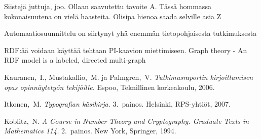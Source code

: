 \documentclass[finnish,12pt]{article}
\begin{document}
Siistejä juttuja, joo. Ollaan saavutettu tavoite A. Tässä hommassa kokonaisuutena on vielä haasteita. Olisipa hienoa saada selville asia Z

Automaatiosuunnittelu on siirtynyt yhä enemmän tietopohjaisesta tutkimuksesta

RDF:ää voidaan käyttää tehtaan PI-kaavion miettimiseen.
Graph theory - An RDF model is a labeled, directed multi-graph


\clearpage
{}

\begin{thebibliography}{99}
	 Kauranen,\ I., Mustakallio,\ M. ja Palmgren,\ V.
	  \textit{Tutkimusraportin kirjoittamisen opas opinnäytetyön
		tekijöille.}  Espoo, Teknillinen korkeakoulu, 2006.

	 Itkonen,\ M. \textit{Typografian käsikirja.} 3.\
	  painos.  Helsinki, RPS-yhtiöt, 2007.

	 Koblitz,\ N. \textit{A Course in Number Theory and
		Cryptography. Graduate Texts in Mathematics 114.}  2.\ painos. New
	  York, Springer, 1994.

	\end{thebibliography}
\end{document}
